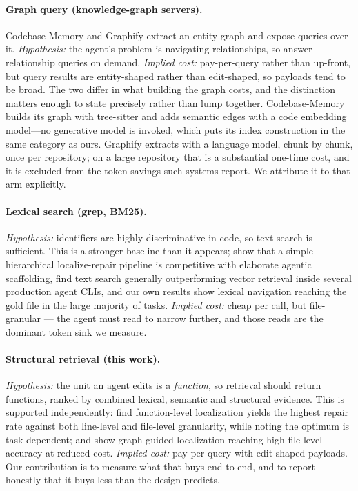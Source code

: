 \documentclass[11pt,letterpaper]{article}
\begin{document}
\paragraph{Graph query (knowledge-graph servers).}
Codebase-Memory \citep{cbmem} and Graphify \citep{graphify} extract an entity
graph and expose queries over it. \emph{Hypothesis:} the agent's problem is
navigating relationships, so answer relationship queries on demand.
\emph{Implied cost:} pay-per-query rather than up-front, but query results are
entity-shaped rather than edit-shaped, so payloads tend to be broad. The two
differ in what building the graph costs, and the distinction matters enough to
state precisely rather than lump together. Codebase-Memory builds its graph with
tree-sitter and adds semantic edges with a code embedding model---no generative
model is invoked, which puts its index construction in the same category as ours.
Graphify extracts with a language model, chunk by chunk, once per repository; on a
large repository that is a substantial one-time cost, and it is excluded from the
token savings such systems report. We attribute it to that arm explicitly.

\paragraph{Lexical search (grep, BM25).}
\emph{Hypothesis:} identifiers are highly discriminative in code, so text search
is sufficient. This is a stronger baseline than it appears; \citet{agentless}
show that a simple hierarchical localize-repair pipeline is competitive with
elaborate agentic scaffolding, \citet{grepallyouneed} find text search generally
outperforming vector retrieval inside several production agent CLIs, and our own
results show lexical navigation reaching the gold file in the large majority of
tasks. \emph{Implied cost:} cheap per call, but file-granular --- the agent must
read to narrow further, and those reads are the dominant token sink we measure.

\paragraph{Structural retrieval (this work).}
\emph{Hypothesis:} the unit an agent edits is a \emph{function}, so retrieval
should return functions, ranked by combined lexical, semantic and structural
evidence. This is supported independently: \citet{granularity} find function-level
localization yields the highest repair rate against both line-level and file-level
granularity, while noting the optimum is task-dependent; and \citet{locagent} show
graph-guided localization reaching high file-level accuracy at reduced cost.
\emph{Implied cost:} pay-per-query with edit-shaped payloads. Our contribution is
to measure what that buys end-to-end, and to report honestly that it buys less
than the design predicts.
\end{document}
